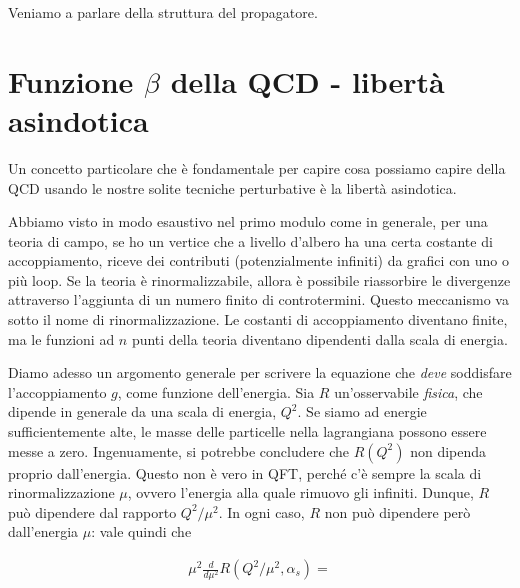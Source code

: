 \documentclass[11pt]{report}
\begin{document}
Veniamo a parlare della struttura del propagatore. 

\section{Funzione \(\beta\) della QCD - libertà asindotica}

Un concetto particolare che è fondamentale per capire cosa possiamo capire della QCD usando le nostre solite tecniche perturbative è la libertà asindotica. 

Abbiamo visto in modo esaustivo nel primo modulo come in generale, per una teoria di campo, se ho un vertice che a livello d'albero ha una certa costante di accoppiamento, riceve dei contributi (potenzialmente infiniti) da grafici con uno o più loop. Se la teoria è rinormalizzabile, allora è possibile riassorbire le divergenze attraverso l'aggiunta di un numero finito di controtermini. Questo meccanismo va sotto il nome di rinormalizzazione. Le costanti di accoppiamento diventano finite, ma le funzioni ad \(n\) punti della teoria diventano dipendenti dalla scala di energia. 

Diamo adesso un argomento generale per scrivere la equazione che \emph{deve} soddisfare l'accoppiamento \(g\), come funzione dell'energia. Sia \(R\) un'osservabile \emph{fisica}, che dipende in generale da una scala di energia, \(Q^2\). Se siamo ad energie sufficientemente alte, le masse delle particelle nella lagrangiana possono essere messe a zero. Ingenuamente, si potrebbe concludere che \(R (Q^2)\) non dipenda proprio dall'energia. Questo non è vero in QFT, perché c'è sempre la scala di rinormalizzazione \(\mu\), ovvero l'energia alla quale rimuovo gli infiniti. Dunque, \(R\) può dipendere dal rapporto \(Q^2/\mu^2\). In ogni caso, \(R\) non può dipendere però dall'energia \(\mu\): vale quindi che 

\begin{align}
  \mu^2 \frac{d}{d\mu^2}R(Q^2/\mu^2, \alpha_s) =  
\end{align}
\end{document}
